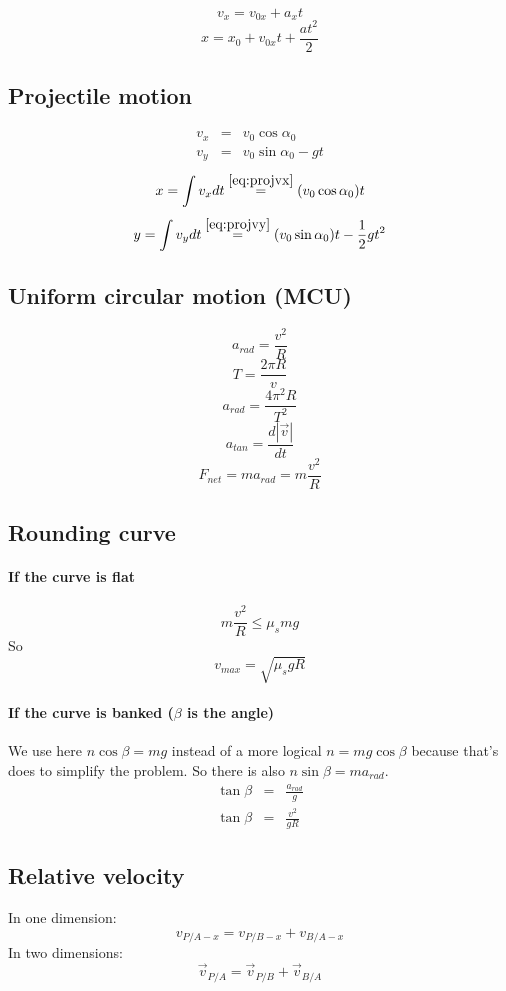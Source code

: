 \documentclass[a4paper,10pt]{article}
\begin{document}
\[ v_x = v_{0x} + a_{x}t \]
\[ x = x_0 + v_{0x} t + \frac{a t^2}{2}\]

\subsection{Projectile motion}

\begin{eqnarray}\label{eq:projvx}
	v_x & = & v_0 \cos{ \alpha_0 }\\\label{eq:projvy}
	v_y & = & v_0 \sin{ \alpha_0 } - gt
\end{eqnarray}
\[ x = \int v_x dt \stackrel{\eqref{eq:projvx}}{=} (v_0 \cos{ \alpha_0 }) t \]
\[ y = \int v_y dt \stackrel{\eqref{eq:projvy}}{=} (v_0 \sin{ \alpha_0 }) t - \frac{1}{2} g t^2 \]

\subsection{Uniform circular motion (MCU)}
\[ a_{rad} = \frac{v^2}{R} \]
\[ T = \frac{2\pi R}{v}\]
\[ a_{rad} = \frac{4\pi^2 R}{T^2} \]
\[ a_{tan} = \frac{ d|\vec{v}| }{ dt }\]
\[ F_{net} = ma_{rad} = m\frac{v^2}{R}\]

\subsection{Rounding curve}
\paragraph{If the curve is flat}
\[ m\frac{v^2}{R} \leq \mu_smg \]
So
\[ v_{max} = \sqrt{\mu_s g R} \]
\paragraph{If the curve is banked ($ \beta $ is the angle)}
We use here $n\cos\beta = mg$ instead of a more logical $n = mg\cos\beta$ because that's \cite[p.~157]{young} does to simplify the problem. So there is also $n\sin\beta = ma_{rad}$.
\begin{eqnarray*}
\tan{\beta} & = & \frac{a_{rad}}{g}\\
\tan{\beta} & = & \frac{v^2}{gR}
\end{eqnarray*}

\subsection{Relative velocity}
In one dimension: 
\[ v_{P/A-x} = v_{P/B-x} + v_{B/A-x} \]
In two dimensions:
\[ \vec{v}_{P/A} = \vec{v}_{P/B} + \vec{v}_{B/A} \]
\end{document}
